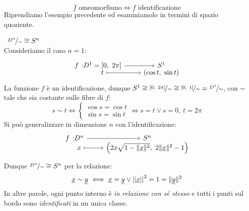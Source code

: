 \begin{equation}
	\overline{f} \text{ omeomorfismo} \iff f \text{ identificazione}
\end{equation}
\vspace{-1.5mm}
Riprendiamo l'esempio precedente ed esaminiamolo in termini di spazio quoziente.
\begin{example}~{$\nicefrac{D^n}{\sim}\cong S^n$}\\
	Consideriamo il caso $n=1$:
	\begin{equation*}
		\funztot f {D^1=[0, \ 2\pi]} {S^1} t {(\cos t, \ \sin t)}
	\end{equation*}
	La funzione $f$ è un identificazione, dunque $S^1\cong \nicefrac{[0, \ 2\pi]}{\sim}\cong \nicefrac{[0, \ 1]}{\sim}=\nicefrac{D^1}{\sim}$, con $\sim$ tale che sia costante sulle fibre di $f$:
	\begin{equation*}
		 s\sim t \iff \begin{cases}
			\cos s=\cos t \\
			\sin s =\sin t
		\end{cases} \iff s=t  \vee s=0,\ t=2\pi
	\end{equation*} \newline
	Si può generalizzare in dimensione $n$ con l'identificazione:
	\begin{equation*}
		\funztot f {D^n} {S^n} x {\left( 2x\sqrt{1- \| \underline{x} \|^2}, \ 2\| \underline{x}\|^2 -1 \right)}
	\end{equation*}
	Dunque $\nicefrac{D^n}{\sim}\cong S^n$ per la relazione:
\begin{equation*}
	\underline{x}\sim \underline{y} \iff \underline{x}=\underline{y} \vee \left|\left| \underline{x} \right|\right| ^2 = 1 = \| \underline{y} \| ^2
\end{equation*}
	In altre parole, ogni punto interno è \textit{in relazione con sé stesso} e tutti i punti sul bordo sono \textit{identificati} in un unica classe.
\end{example}
	
